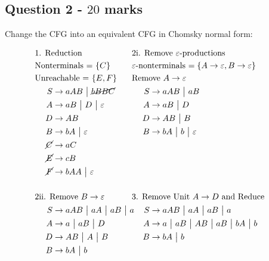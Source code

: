 \documentclass[12pt]{article}
\begin{document}
\subsection*{Question 2 - $20$ marks}

Change the CFG into an equivalent CFG in Chomsky normal form:

\begin{align*}
&\hspace{-.75cm}\text{1. Reduction } & &\hspace{-.75cm}\text{2i. Remove $\varepsilon$-productions}\\
&\hspace{-.75cm}\text{Nonterminals = $\{C\}$} 		& & \hspace{-.75cm}\text{$\varepsilon$-nonterminals $=\{A \rightarrow \varepsilon, B \rightarrow \varepsilon \}$}\\
&\hspace{-.75cm}\text{Unreachable = $\{E,F\}$} 	& & \hspace{-.75cm}\text{Remove $A \rightarrow \varepsilon$}\\
S & \rightarrow aAB \BAR \cancel{bBBC} 		&  S &\rightarrow aAB \BAR aB \\
A & \rightarrow aB \BAR D \BAR \varepsilon	&  A &\rightarrow aB \BAR D \\
D & \rightarrow AB 						&  D &\rightarrow AB \BAR B \\
B & \rightarrow bA \BAR \varepsilon			&  B &\rightarrow bA \BAR b \BAR \varepsilon \\
\cancel{C} & \rightarrow aC				&  \\
\cancel{E} & \rightarrow cB				&  \\
\cancel{F} & \rightarrow bAA \BAR \varepsilon	&  \\
& & & \\
&\hspace{-.75cm}\text{2ii. Remove $B \rightarrow \varepsilon$} & &\hspace{-.75cm}\text{3. Remove Unit $A \rightarrow D$ and Reduce}\\
S & \rightarrow aAB \BAR aA \BAR aB \BAR a	&  S & \rightarrow aAB \BAR aA \BAR aB \BAR a \\
A & \rightarrow a \BAR aB \BAR D 			&  A &\rightarrow a \BAR aB \BAR AB \BAR aB \BAR bA \BAR b \\
D & \rightarrow AB \BAR A \BAR B			&  B &\rightarrow bA \BAR b \\
B & \rightarrow bA \BAR b				&  \\

\end{align*}
\end{document}
